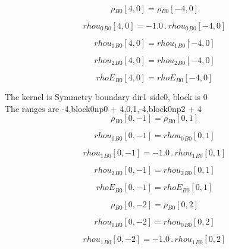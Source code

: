 \documentclass{article}
\begin{document}
\begin{dmath}{\rho{_{B0}}}[{4,0}] = {\rho{_{B0}}}[{-4,0}]\end{dmath}

\begin{dmath}{rhou_{0}{_{B0}}}[{4,0}] = - 1.0 \,.\, {rhou_{0}{_{B0}}}[{-4,0}]\end{dmath}

\begin{dmath}{rhou_{1}{_{B0}}}[{4,0}] = {rhou_{1}{_{B0}}}[{-4,0}]\end{dmath}

\begin{dmath}{rhou_{2}{_{B0}}}[{4,0}] = {rhou_{2}{_{B0}}}[{-4,0}]\end{dmath}

\begin{dmath}{rhoE{_{B0}}}[{4,0}] = {rhoE{_{B0}}}[{-4,0}]\end{dmath}

\noindent The kernel is Symmetry boundary dir1 side0, block is 0\\\noindent The ranges are -4,block0np0 + 4,0,1,-4,block0np2 + 4\\\begin{dmath}{\rho{_{B0}}}[{0,-1}] = {\rho{_{B0}}}[{0,1}]\end{dmath}

\begin{dmath}{rhou_{0}{_{B0}}}[{0,-1}] = {rhou_{0}{_{B0}}}[{0,1}]\end{dmath}

\begin{dmath}{rhou_{1}{_{B0}}}[{0,-1}] = - 1.0 \,.\, {rhou_{1}{_{B0}}}[{0,1}]\end{dmath}

\begin{dmath}{rhou_{2}{_{B0}}}[{0,-1}] = {rhou_{2}{_{B0}}}[{0,1}]\end{dmath}

\begin{dmath}{rhoE{_{B0}}}[{0,-1}] = {rhoE{_{B0}}}[{0,1}]\end{dmath}

\begin{dmath}{\rho{_{B0}}}[{0,-2}] = {\rho{_{B0}}}[{0,2}]\end{dmath}

\begin{dmath}{rhou_{0}{_{B0}}}[{0,-2}] = {rhou_{0}{_{B0}}}[{0,2}]\end{dmath}

\begin{dmath}{rhou_{1}{_{B0}}}[{0,-2}] = - 1.0 \,.\, {rhou_{1}{_{B0}}}[{0,2}]\end{dmath}
\end{document}
